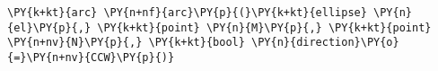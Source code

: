 \begin{Verbatim}[commandchars=\\\{\}]
    \PY{k+kt}{arc} \PY{n+nf}{arc}\PY{p}{(}\PY{k+kt}{ellipse} \PY{n}{el}\PY{p}{,} \PY{k+kt}{point} \PY{n}{M}\PY{p}{,} \PY{k+kt}{point} \PY{n+nv}{N}\PY{p}{,} \PY{k+kt}{bool} \PY{n}{direction}\PY{o}{=}\PY{n+nv}{CCW}\PY{p}{)}
\end{Verbatim}
